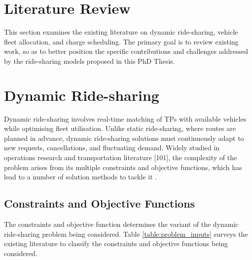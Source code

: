 \section{Literature Review}
\label{sec:literature_review}
This section examines the existing literature on dynamic ride-sharing, vehicle fleet allocation, and charge scheduling. The primary goal is to review existing work, so as to better position the specific contributions and challenges addressed by the ride-sharing models proposed in this PhD Thesis.

\section{Dynamic Ride-sharing}
Dynamic ride-sharing involves real-time matching of TPs with available vehicles while optimising fleet utilisation. Unlike static ride-sharing, where routes are planned in advance, dynamic ride-sharing solutions must continuously adapt to new requests, cancellations, and fluctuating demand. Widely studied in operations research and transportation literature [101], the complexity of the problem arises from its multiple constraints and objective functions, which has lead to a number of solution methods to tackle it \cite{meng2021dynamic}.

\subsection{Constraints and Objective Functions}
\label{objectives_constraints}
The constraints and objective function determines the variant of the dynamic ride-sharing problem being considered. Table \ref{table:problem_inputs} surveys the existing literature to classify the constraints and objective functions being considered.

